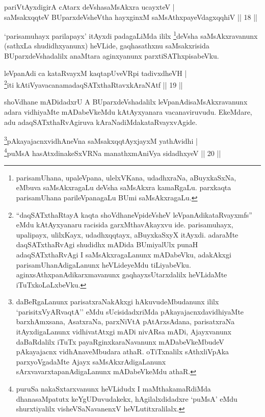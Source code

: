 
\begin{shl}
pariVtAyxdigirA cAtarx deVshasaMsAkxra ucayxteV | \\
saMsakxqqteV BUparxdeVsheV\s tha hayxginxM saMsAthxpayeVdagxqqhiV \hfill|| 18 || 
\end{shl}

\begin{artha}
`parisamuhayx parilapayx' itAyxdi padagaLiMda ililx \footnote{parisamUhana, upaleVpana, ulelxVKana, udadhxraNa, aBuyxkaSxNa, eMbuva saMsAkxragaLu deVsha saMsAkxra kamaRgaLu. parxkaqta parisamUhana parileVpanagaLu BUmi saMsAkxragaLu.}deVsha saMsAkxravanunx (sathxLa shudidhxyanunx) heVLide, gaqhasathxnu saMsakxrisida BUparxdeVshadalilx anaMtara aginxyanunx parxtiSAThxpisabeVku.
\end{artha}

\begin{shl}
leVpanAdi ca kataRvayxM kaqtapUveVR\s pi tadivxdheVH | \\
\footnote{``daqSATxthaRtayA kaqta shoVdhaneV\s pideVsheV leVpanAdikataRvayxmfs'' eMdu kAtAyxyanaru racisida garxMthavAkayxvu ide. parisamuhayx, upalipayx, ulilxKayx, udadhxqqtayx, aBuyxkaSxyX itAyxdi. adaraMte daqSATxthaRvAgi shudidhx mADida BUmiyalUlx punaH adaqSATxthaRvAgi I saMsAkxragaLanunx mADabeVku, adakAkxgi parisamUhanAdigaLanunx heVLideyeMdu tiLiyabeVku. aginxsAthxpanAdikarxmavanunx gaqhayxsUtarxdalilx heVLidaMte iTuTxkoLaLxbeVku.}iti kAtiVyavacanamadaqSATxthaRtavxkAraNAtf \hfill|| 19 || 
\end{shl}

\begin{artha}
shoVdhane mADidadxrU A BUparxdeVshadalilx leVpanAdi\break saMsAkxravanunx adara vidhiyaMte mADabeVkeMdu kAtAyxyanara vacanaviruvudu. EkeMdare, adu adaqSATxthaRvAgiruva kAraNadiMda\break kataRvayxvAgide.
\end{artha}


\begin{shl}
\footnote{daBeRgaLanunx parisatxraNakAkxgi hAkuvudeMbudanunx ililx `parisitxVyARvaqtA'' eMdu sUcisidadxriMda pAkayajacnxdavidhiyaMte barxhAmxsana, AsatxraNa, parxNiVtA pAtArxsAdana, parisatxraNa itAyxdigaLanunx vidhivatAtxgi mADi nivARsa mADi, Ajayxvanunx daBaRdalilx iTuTx payaRginxkaraNavanunx mADabeVkeMbudeV pAkayajacnx vidhAnaveMbudara athaR. oTiTxnalilx sAthxliVpAka parxyoVgadaMte Ajayx saMsAkxrAdigaLanunx sArxvavarxtapanAdigaLanunx mADabeVkeMdu athaR.}pAkayajacnxvidhAneVna saMsakxqqtAyx\s \s jayxM yathAvidhi | \\
\footnote{puruSa nakaSxtarxvanunx heVLidudx I maMthakamaRdiMda dhanasaMpatutx keYgUDuvudakekx, hAgilalxdidadxre `puMsA' eMdu shurxtiyalilx visheVSaNavanenxV heVLutitxralilalx.}puMsA hasAtxdinakeSxVRNa manathxmAniVya sidadhxyeV \hfill|| 20 || 
\end{shl}



